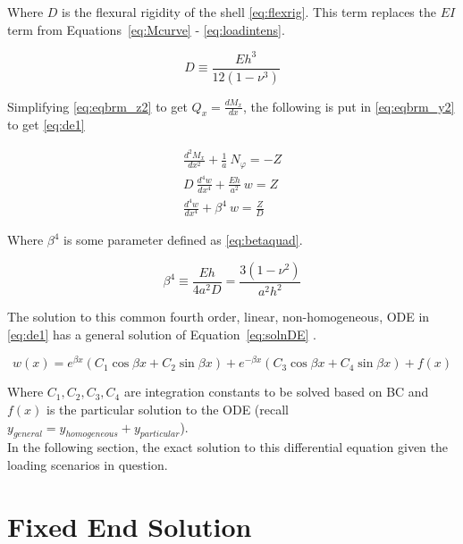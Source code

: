 Where $D$ is the flexural rigidity of the shell \ref{eq:flexrig}. This term replaces the $EI$ term from Equations~\ref{eq:Mcurve} - \ref{eq:loadintens}.

\begin{equation}
	\label{eq:flexrig}
	D \equiv \frac{Eh^3}{12(1-\nu^3)}
\end{equation}

Simplifying \ref{eq:eqbrm_z2} to get $Q_x = \frac{dM_x}{dx}$, the following is put in \ref{eq:eqbrm_y2} to get \ref{eq:de1}

\begin{equation}
	\label{eq:de1}
	\begin{aligned}
		\frac{d^2M_x}{dx^2}+\frac{1}{a} \ N_\varphi = -Z \\
		D\ \frac{d^4w}{dx^4}+\frac{Eh}{a^2} \ w = Z      \\
		\frac{d^4w}{dx^4}+\beta^4 \ w = \frac{Z}{D}      
	\end{aligned}
\end{equation} 

Where $\beta^4$ is some parameter defined as \ref{eq:betaquad}.

\begin{equation}
	\label{eq:betaquad}
	\beta^4 \equiv \frac{Eh}{4a^2D}= \frac{3(1-\nu^2)}{a^2h^2}
\end{equation}

The solution to this common fourth order, linear, non-homogeneous, ODE in \ref{eq:de1} has a general solution of Equation~\ref{eq:solnDE} \cite{timoshenko1959theory}.

\begin{equation}
	\label{eq:solnDE}
	w(x)=e^{\beta x} \left(C_1 \cos \beta x +C_2 \sin \beta x \right)+e^{-\beta x} \left(C_3 \cos \beta x +C_4 \sin \beta x \right) +f(x)
\end{equation}

Where $ C_1, C_2, C_3, C_4$ are integration constants to be solved based on BC and $f(x)$ is the particular solution to the ODE (recall $y_{general}=y_{homogeneous}+y_{particular}$).\\

In the following section, the exact solution to this differential equation given the loading scenarios in question.

\section{Fixed End Solution}

